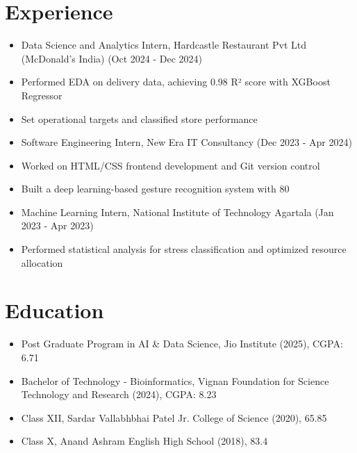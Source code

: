 \documentclass[10pt]{article}
\begin{document}
\section*{Experience}
\vspace{0.05cm}
\begin{itemize}[leftmargin=0.5cm, itemsep=2pt]

  \item Data Science and Analytics Intern, Hardcastle Restaurant Pvt Ltd (McDonald's India) (Oct 2024 - Dec 2024)

  \item Performed EDA on delivery data, achieving 0.98 R² score with XGBoost Regressor

  \item Set operational targets and classified store performance

  \item Software Engineering Intern, New Era IT Consultancy (Dec 2023 - Apr 2024)

  \item Worked on HTML/CSS frontend development and Git version control

  \item Built a deep learning-based gesture recognition system with 80%

  \item Machine Learning Intern, National Institute of Technology Agartala (Jan 2023 - Apr 2023)

  \item Performed statistical analysis for stress classification and optimized resource allocation

\end{itemize}



\section*{Education}
\vspace{0.05cm}
\begin{itemize}[leftmargin=0.5cm, itemsep=2pt]

  \item Post Graduate Program in AI & Data Science, Jio Institute (2025), CGPA: 6.71

  \item Bachelor of Technology - Bioinformatics, Vignan Foundation for Science Technology and Research (2024), CGPA: 8.23

  \item Class XII, Sardar Vallabhbhai Patel Jr. College of Science (2020), 65.85%

  \item Class X, Anand Ashram English High School (2018), 83.4%

\end{itemize}
\end{document}
